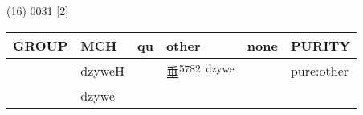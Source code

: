 \documentclass[14pt,a4paper]{scrartcl}
\begin{document}
(16) 0031 {[}2{]}

\begin{longtable}[c]{@{}llllll@{}}
\toprule
\begin{minipage}[b]{0.14\columnwidth}\raggedright\strut
GROUP
\strut\end{minipage} &
\begin{minipage}[b]{0.14\columnwidth}\raggedright\strut
MCH
\strut\end{minipage} &
\begin{minipage}[b]{0.14\columnwidth}\raggedright\strut
qu
\strut\end{minipage} &
\begin{minipage}[b]{0.14\columnwidth}\raggedright\strut
other
\strut\end{minipage} &
\begin{minipage}[b]{0.14\columnwidth}\raggedright\strut
none
\strut\end{minipage} &
\begin{minipage}[b]{0.14\columnwidth}\raggedright\strut
PURITY
\strut\end{minipage}\tabularnewline
\midrule
\endhead
\begin{minipage}[t]{0.14\columnwidth}\raggedright\strut
𠂹
\strut\end{minipage} &
\begin{minipage}[t]{0.14\columnwidth}\raggedright\strut
dzyweH
\strut\end{minipage} &
\begin{minipage}[t]{0.14\columnwidth}\raggedright\strut
\strut\end{minipage} &
\begin{minipage}[t]{0.14\columnwidth}\raggedright\strut
垂\textsuperscript{5782~dzywe}
\strut\end{minipage} &
\begin{minipage}[t]{0.14\columnwidth}\raggedright\strut
\strut\end{minipage} &
\begin{minipage}[t]{0.14\columnwidth}\raggedright\strut
pure:other
\strut\end{minipage}\tabularnewline
\begin{minipage}[t]{0.14\columnwidth}\raggedright\strut
𡍮
\strut\end{minipage} &
\begin{minipage}[t]{0.14\columnwidth}\raggedright\strut
dzywe
\strut\end{minipage} &
\begin{minipage}[t]{0.14\columnwidth}\raggedright\strut

\end{minipage}
\end{longtable}
\end{document}
